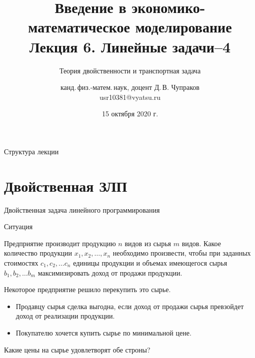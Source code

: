 \documentclass[unicode,11pt,notheorems,xcolor=table]{beamer}
\author[Д.\,В. Чупраков]{канд.\,физ.-матем.\,наук, доцент Д.\,В. Чупраков\\[6pt] usr10381@vyatsu.ru}
\institute[ВятГУ]{ФГБОУ ВО Вятский государственный университет}
\title[Лекция~6. Линейные задачи. Часть~4 из 4]{
	Введение в экономико-математическое моделирование\\[12pt]
	Лекция 6. Линейные задачи--4}
\subtitle{Теория двойственности и транспортная задача}
\date{15 октября 2020 г.}
\begin{document}
\maketitle

\begin{frame}{Структура лекции}
	\tableofcontents
\end{frame}


\section{Двойственная ЗЛП}
\begin{frame}{}{}
	\centering 
	\Large Двойственная задача линейного программирования
\end{frame}

\begin{frame}{Ситуация}
	
	Предприятие производит продукцию $n$ видов из сырья $m$ видов. 
	Какое количество продукции $x_1, x_2,\ldots, x_n$ необходимо произвести, чтобы при заданных стоимостях $c_1, c_2,\ldots c_n$ единицы продукции и объемах имеющегося сырья $b_1, b_2, \ldots b_m$ максимизировать доход от продажи продукции.

\pause
\bigskip
\begin{block}{Некоторое предприятие решило перекупить это сырье.}


\begin{itemize}
\item 
	Продавцу сырья сделка выгодна, если доход от продажи сырья превзойдет доход от реализации продукции.
\item 
	Покупателю хочется купить сырье по минимальной цене.
\end{itemize}

\alert{Какие цены на сырье удовлетворят обе строны?}
\end{block}


%



\end{frame}
\end{document}
